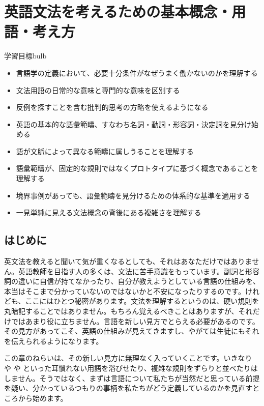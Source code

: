 \chapter{英語文法を考えるための基本概念・用語・考え方}\label{ch:1}

\begin{tblsframedsymbol}{学習目標}{bulb}
  \begin{itemize}[noitemsep, leftmargin=*]
      \item 言語学の定義において、必要十分条件がなぜうまく働かないのかを理解する
      \item 文法用語の日常的な意味と専門的な意味を区別する
      \item 反例を探すことを含む批判的思考の方略を使えるようになる
      \item 英語の基本的な語彙範疇、すなわち名詞・動詞・形容詞・決定詞を見分け始める
      \item 語が文脈によって異なる範疇に属しうることを理解する
      \item 語彙範疇が、固定的な規則ではなくプロトタイプに基づく概念であることを理解する
      \item 境界事例があっても、語彙範疇を見分けるための体系的な基準を適用する
      \item 一見単純に見える文法概念の背後にある複雑さを理解する
  \end{itemize}
  \end{tblsframedsymbol}

\section{はじめに}\label{sec:intro1}

英文法を教えると聞いて気が重くなるとしても、それはあなただけではありません。英語教師を目指す人の多くは、文法に苦手意識をもっています。副詞と形容詞の違いに自信が持てなかったり、自分が教えようとしている言語の仕組みを、本当はそこまで分かっていないのではないかと不安になったりするのです。けれども、ここにはひとつ秘密があります。文法を理解するというのは、硬い規則を丸暗記することではありません。もちろん覚えるべきことはありますが、それだけではあまり役に立ちません。言語を新しい見方でとらえる必要があるのです。その見方があってこそ、英語の仕組みが見えてきますし、やがては生徒にもそれを伝えられるようになります。

この章のねらいは、その新しい見方に無理なく入っていくことです。いきなり  や  や  といった耳慣れない用語を浴びせたり、複雑な規則をずらりと並べたりはしません。そうではなく、まずは言語について私たちが当然だと思っている前提を疑い、分かっているつもりの事柄を私たちがどう定義しているのかを見直すところから始めます。

